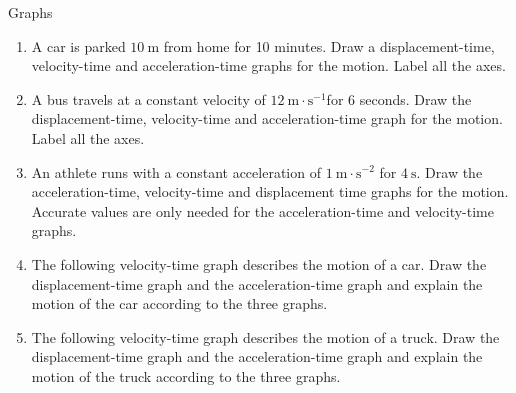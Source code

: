\begin{exercises}{Graphs }
            \nopagebreak \noindent
          \label{m38795*id72955}\begin{enumerate}[noitemsep, label=\textbf{\arabic*}. ] 
            \label{m38795*uid116}\item A car is parked $10~\text{m}$ from home for 10 minutes. Draw a displacement-time, velocity-time and acceleration-time graphs for the motion. Label all the axes.\newline
\label{m38795*uid117}\item A bus travels at a constant velocity of $12~\text{m}\ensuremath{\cdot}\text{s}{}^{-1}$for 6 seconds. Draw the displacement-time, velocity-time and acceleration-time graph for the motion. Label all the axes.\newline
\label{m38795*uid118}\item An athlete runs with a constant acceleration of $1~\text{m}\ensuremath{\cdot}\text{s}{}^{-2}$ for $4~\text{s}$. Draw the acceleration-time, velocity-time and displacement time graphs for the motion. Accurate values are only needed for the acceleration-time and velocity-time graphs.\newline
\label{m38795*uid119}\item The following velocity-time graph describes the motion of a car. Draw the displacement-time graph and the acceleration-time graph and explain the motion of the car according to the three graphs.
\begin{figure}[H] %
\begin{center}
\end{center}

\end{figure}   
\label{m38795*uid120}\item The following velocity-time graph describes the motion of a truck. Draw the displacement-time graph and the acceleration-time graph and explain the motion of the truck according to the three graphs.
\begin{figure}[H] %
\begin{center}
\end{center}
 \end{figure}               \end{enumerate}


\end{exercises}
